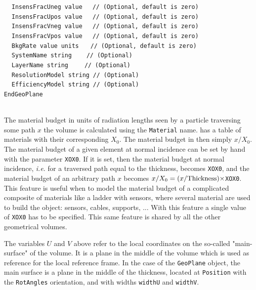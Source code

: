 $~~~~~${\tt InsensFracUneg   value                              $~~$   // (Optional, default is zero)} \\
$~~~~~${\tt InsensFracUpos   value                              $~~$   // (Optional, default is zero)} \\
$~~~~~${\tt InsensFracVneg   value                              $~~$   // (Optional, default is zero)} \\
$~~~~~${\tt InsensFracVpos   value                              $~~$   // (Optional, default is zero)} \\
$~~~~~${\tt BkgRate          value units                       $~~~$   // (Optional, default is zero)} \\
$~~~~~${\tt SystemName       string                          $~~~~~$   // (Optional)} \\
$~~~~~${\tt LayerName        string                         $~~~~~~$   // (Optional)} \\
$~~~~~${\tt ResolutionModel  string                                    // (Optional)} \\
$~~~~~${\tt EfficiencyModel  string                                    // (Optional)} \\
{\tt EndGeoPlane}

~\\
The material budget in units of radiation lengths seen by a particle traversing some path $x$ the volume is calculated using the {\tt Material} 
name. {\guari} has a table of materials with their corresponding $X_0$. The material budget in then simply $x/X_0$. The material budget of a 
given element at normal incidence can be set by hand with the parameter {\tt XOX0}. If it is set, then the material budget at normal incidence, 
{\it i.e.} for a traversed path equal to the thickness, becomes {\tt XOX0}, and the material budget of an arbitrary path $x$ becomes 
$x/X_0 = (x/{\rm Thickness})\times${\tt XOX0}. This feature is useful when to model the material budget of a complicated composite of 
materials like a ladder with sensors, where several material are used to build the object: sensors, cables, supports, ... With this feature a 
single value of {\tt XOX0} has to be specified. This same feature is shared by all the other geometrical volumes.

The variables $U$ and $V$ above refer to the local coordinates on the so-called "main-surface" of the volume. It is 
a plane in the middle of the volume which is used as reference for the local reference frame. In the case of the 
{\tt GeoPlane} object, the main surface is a plane in the middle of the thickness, located at {\tt Position} with the 
{\tt RotAngles} orientation, and with widths {\tt widthU} and {\tt widthV}.

